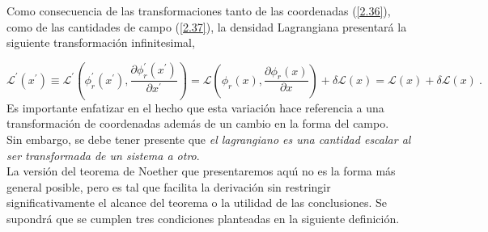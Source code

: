 \noindent
Como consecuencia de las transformaciones tanto de las coordenadas (\ref{2.36}), como de las cantidades de campo (\ref{2.37}), la densidad Lagrangiana presentará la siguiente transformación infinitesimal,  



\begin{equation}
\mathcal{L}^{\prime}\left(x^{\prime}\right) \equiv \mathcal{L}^{\prime} \left(\phi_{r}^{\prime}\left(x^{\prime}\right), \frac{\partial \phi_{r}^{\prime}\left(x^{\prime}\right)}{\partial x^{\prime}}\right)=\mathcal{L}\left(\phi_{r}(x), \frac{\partial \phi_{r}(x)}{\partial x}\right)+\delta \mathcal{L}(x)=\mathcal{L}(x)+\delta \mathcal{L}(x)~.
\label{2.39_a}
\end{equation}
Es importante enfatizar en el hecho que esta variación hace referencia a una transformación de coordenadas además de un cambio en la forma del campo.\\

\noindent
Sin embargo, se debe tener presente que \emph{el lagrangiano es una cantidad escalar al ser transformada de un sistema a otro}.\\

\noindent
La versi\'{o}n del teorema de Noether que presentaremos aqu\'{\i} no es la forma m\'{a}s general posible, pero es tal que facilita la derivaci\'{o}n sin restringir significativamente el alcance del teorema o la utilidad de las conclusiones. Se supondr\'{a} que se cumplen tres condiciones planteadas en la siguiente definición.

